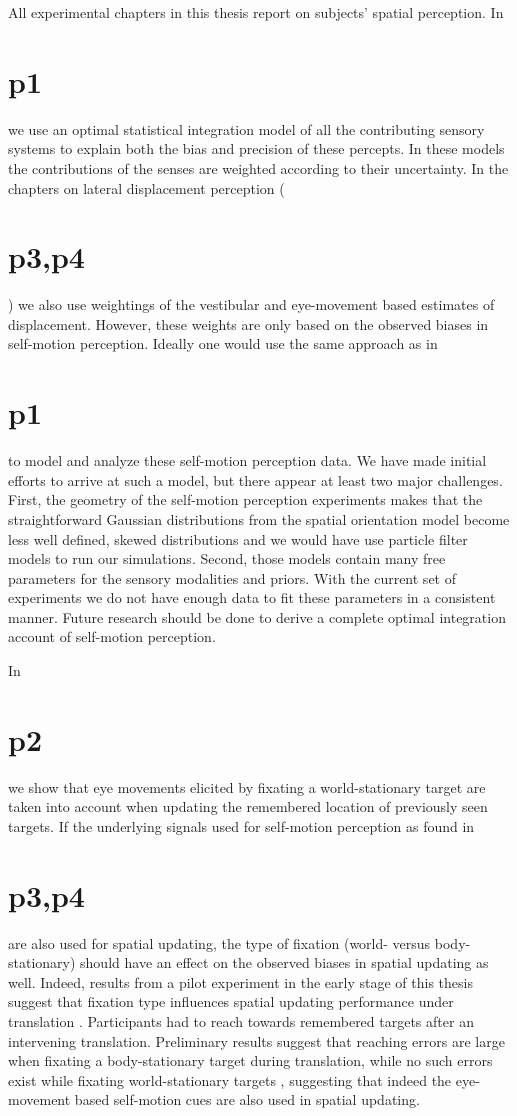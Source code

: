 All experimental chapters in this thesis report on subjects’ spatial perception. In \chapter{p1} we use an optimal statistical integration model of all the contributing sensory systems to explain both the bias and precision of these percepts. In these models the contributions of the senses are weighted according to their uncertainty. In the chapters on lateral displacement perception (\chapter{p3,p4}) we also use weightings of the vestibular and eye-movement based estimates of displacement. However, these weights are only based on the observed biases in self-motion perception. Ideally one would use the same approach as in \chapter{p1} to model and analyze these self-motion perception data. We have made initial efforts to arrive at such a model, but there appear at least two major challenges. First, the geometry of the self-motion perception experiments makes that the straightforward Gaussian distributions from the spatial orientation model become less well defined, skewed distributions and we would have use particle filter models to run our simulations. Second, those models contain many free parameters for the sensory modalities and priors. With the current set of experiments we do not have enough data to fit these parameters in a consistent manner. Future research should be done to derive a complete optimal integration account of self-motion perception.

In \chapter{p2} we show that eye movements elicited by fixating a world-stationary target are taken into account when updating the remembered location of previously seen targets.  If the underlying signals used for self-motion perception as found in \chapter{p3,p4} are also used for spatial updating, the type of fixation (world- versus body-stationary) should have an effect on the observed biases in spatial updating as well. Indeed, results from a pilot experiment in the early stage of this thesis suggest that fixation type influences spatial updating performance under translation \cite{Clemens2010}. Participants had to reach towards remembered targets after an intervening translation. Preliminary results suggest that reaching errors are large when fixating a body-stationary target during translation, while no such errors exist while fixating world-stationary targets \cite{clemens2010}, suggesting that indeed the eye-movement based self-motion cues are also used in spatial updating.

